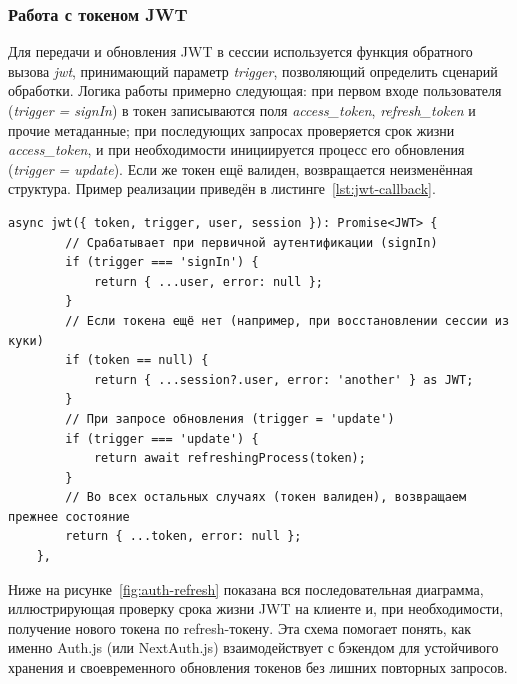 \subsubsection{Работа с токеном JWT}
Для передачи и обновления JWT в сессии используется функция обратного вызова \textit{jwt}, принимающий параметр \textit{trigger}, позволяющий определить сценарий обработки. Логика работы примерно следующая: при первом входе пользователя (\textit{trigger = signIn}) в токен записываются поля \textit{access\_token}, \textit{refresh\_token} и прочие метаданные; при последующих запросах проверяется срок жизни \textit{access\_token}, и при необходимости инициируется процесс его обновления (\textit{trigger = update}). Если же токен ещё валиден, возвращается неизменённая структура. Пример реализации приведён в листинге~\ref{lst:jwt-callback}.

\begin{lstlisting}[caption={JWT-callback с учётом trigger}, label={lst:jwt-callback}]
	async jwt({ token, trigger, user, session }): Promise<JWT> {
		// Срабатывает при первичной аутентификации (signIn)
		if (trigger === 'signIn') {
			return { ...user, error: null };
		}
		// Если токена ещё нет (например, при восстановлении сессии из куки)
		if (token == null) {
			return { ...session?.user, error: 'another' } as JWT;
		}
		// При запросе обновления (trigger = 'update')
		if (trigger === 'update') {
			return await refreshingProcess(token);
		}
		// Во всех остальных случаях (токен валиден), возвращаем прежнее состояние
		return { ...token, error: null };
	},
\end{lstlisting}

Ниже на рисунке~\ref{fig:auth-refresh} показана вся последовательная диаграмма, иллюстрирующая проверку срока жизни JWT на клиенте и, при необходимости, получение нового токена по refresh-токену. Эта схема помогает понять, как именно Auth.js (или NextAuth.js) взаимодействует с бэкендом для устойчивого хранения и своевременного обновления токенов без лишних повторных запросов.

